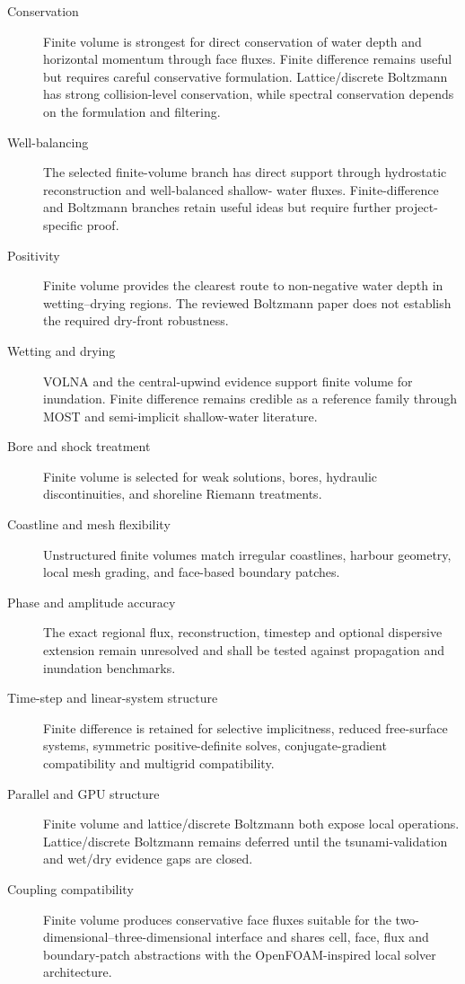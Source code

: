 \begin{description}
  \item[Conservation] Finite volume is strongest for direct
    conservation of water depth and horizontal momentum through face
    fluxes. Finite difference remains useful but requires careful
    conservative formulation. Lattice/discrete Boltzmann has strong
    collision-level conservation, while spectral conservation depends on
    the formulation and filtering.
  \item[Well-balancing] The selected finite-volume branch has direct
    support through hydrostatic reconstruction and well-balanced shallow-
    water fluxes. Finite-difference and Boltzmann branches retain useful
    ideas but require further project-specific proof.
  \item[Positivity] Finite volume provides the clearest route to
    non-negative water depth in wetting--drying regions. The reviewed
    Boltzmann paper does not establish the required dry-front
    robustness.
  \item[Wetting and drying] VOLNA and the central-upwind evidence
    support finite volume for inundation. Finite difference remains
    credible as a reference family through MOST and semi-implicit
    shallow-water literature.
  \item[Bore and shock treatment] Finite volume is selected for weak
    solutions, bores, hydraulic discontinuities, and shoreline Riemann
    treatments.
  \item[Coastline and mesh flexibility] Unstructured finite volumes
    match irregular coastlines, harbour geometry, local mesh grading,
    and face-based boundary patches.
  \item[Phase and amplitude accuracy] The exact regional flux,
    reconstruction, timestep and optional dispersive extension remain
    unresolved and shall be tested against propagation and inundation
    benchmarks.
  \item[Time-step and linear-system structure] Finite difference is
    retained for selective implicitness, reduced free-surface systems,
    symmetric positive-definite solves, conjugate-gradient compatibility
    and multigrid compatibility.
  \item[Parallel and GPU structure] Finite volume and lattice/discrete
    Boltzmann both expose local operations. Lattice/discrete Boltzmann
    remains deferred until the tsunami-validation and wet/dry evidence
    gaps are closed.
  \item[Coupling compatibility] Finite volume produces conservative
    face fluxes suitable for the two-dimensional--three-dimensional
    interface and shares cell, face, flux and boundary-patch abstractions
    with the OpenFOAM-inspired local solver architecture.
\end{description}

